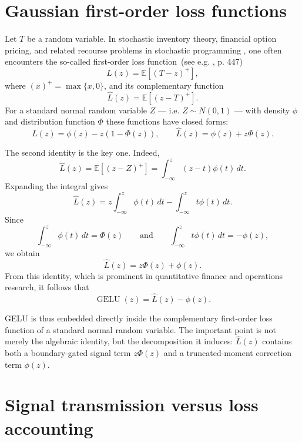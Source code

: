 \documentclass[11pt]{article}
\begin{document}
\section{Gaussian first-order loss functions}
\label{sec:first-order-loss-functions}

Let $T$ be a random variable.
In stochastic inventory theory, financial option pricing, and related recourse problems in stochastic programming \cite{Birge2011}, one often encounters the so-called first-order loss function~(see e.g. \cite{Zipkin2000-di}, p. 447)
$$
L(z)=\mathbb{E}[(T-z)^+],
$$
where $(x)^+=\max\{x,0\}$, and its complementary function \cite{Rossi2014}
$$
\widehat{L}(z)=\mathbb{E}[(z-T)^+].
$$
For a standard normal random variable $Z$ --- i.e. $Z\sim N(0,1)$ ---
with density $ \phi $ and distribution function $ \Phi $
these functions have closed forms:
$$
L(z)=\phi(z)-z(1-\Phi(z)), \qquad \widehat{L}(z)=\phi(z)+z\Phi(z).
$$

The second identity is the key one. Indeed,
$$
\widehat{L}(z)
=
\mathbb{E}[(z-Z)^+]
=
\int_{-\infty}^{z}(z-t)\phi(t)\,dt.
$$
Expanding the integral gives
$$
\widehat{L}(z)
=
z\int_{-\infty}^{z}\phi(t)\,dt
-
\int_{-\infty}^{z}t\phi(t)\,dt.
$$
Since
$$
\int_{-\infty}^{z}\phi(t)\,dt=\Phi(z)
\qquad\text{and}\qquad
\int_{-\infty}^{z}t\phi(t)\,dt=-\phi(z),
$$
we obtain
$$
\widehat{L}(z)=z\Phi(z)+\phi(z).
$$
From this identity, which is prominent in quantitative finance and operations research, it follows that
$$
\operatorname{GELU}(z)=\widehat{L}(z)-\phi(z).
$$

GELU is thus embedded directly inside the complementary first-order loss function of a standard normal random variable. The important point is not merely the algebraic identity, but the decomposition it induces: $ \widehat{L}(z) $ contains both a boundary-gated signal term $z\Phi(z)$ and a truncated-moment correction term $\phi(z)$.

\section{Signal transmission versus loss accounting}
\label{sec:signal-transmission}
\end{document}
